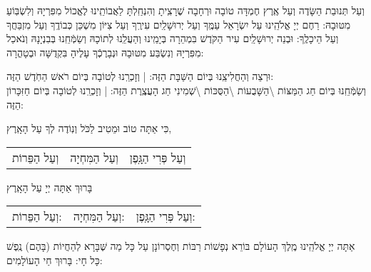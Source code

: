 \documentclass[a4paper, twoside, openany, parskip=half, 10pt]{article}
\begin{document}
וְעַל תְּנוּבַת הַשָּׂדֶה וְעַל אֶֽרֶץ חֶמְדָּה טוֹבָה וּרְחָבָה 
שֶׁרָצִֽיתָ וְהִנְחַֽלְתָּ לַאֲבוֹתֵֽינוּ לֶאֱכוֹל מִפִּרְיָהּ וְלִשְׂבּֽוֹעַ מִטּוּבָהּ: 
רַחֶם יְיָ אֱלֹהֵֽינוּ עַל יִשְׂרָאֵל עַמֶּֽךָ וְעַל יְרוּשָׁלַֽיִם עִירֶֽךָ וְעַל צִיּוֹן מִשְׁכַּן כְּבוֹדֶֽךָ וְעַל מִזְבַּחֲךָ וְעַל הֵיכָלֶֽךָ: וּבְנֵה יְרוּשָׁלַֽיִם עִיר הַקֹּדֶשׁ בִּמְהֵרָה בְּיָמֵֽינוּ וְהַעֲלֵֽנוּ לְתוֹכָהּ וְשַׂמְּֿחֵֽנוּ בְּבִנְיָנָהּ וְנֹאכַל מִפִּרְיָהּ וְנִשְׂבַּע מִטּוּבָהּ וּנְבָרֶכְֿךָ עָלֶיהָ בִּקְדֻשָּׁה וּבְטָהֳרָה:

\begin{small}

וּרְצֵה וְהַחֲלִיצֵֽנוּ בְּיוֹם הַשַּׁבָּת הַזֶּה: | 
וְזָכְרֵֽנוּ לְטוֹבָה בְּיוֹם רֹאשׁ הַחֹֽדֶשׁ הַזֶּה: \\
וְשַׂמְּֿחֵֽנוּ בְּיוֹם 
חַג הַמַּצּוֹת \textbackslash הַשָּׁבֻעוֹת \textbackslash הַסֻּכּוֹת \textbackslash  שְׁמִינִי חַג הָעֲצֶֽרֶת הַזֶּה: | 
וְזָכְרֵֽנוּ לְטוֹבָה בְּיוֹם חַזִּכָּרוֹן הַזֶּה:

\end{small}

כִּי אַתָּה טוֹב וּמֵטִיב לַכֹּל וְנֽוֹדֶה לְךָ עַל הָאָֽרֶץ, 

\begin{tabular}{c|c|c}
וְעַל הַפֵּרוֹת & וְעַל הַמִּחְיָה & וְעַל פְּרִי הַגָּֽפֶן
\end{tabular}

בָּרוּךְ אַתָּה יְיָ עַל הָאָֽרֶץ 

\begin{tabular}{c|c|c}
וְעַל הַפֵּרוֹת: & וְעַל הַמִּחְיָה: & וְעַל פְּרִי הַגָּֽפֶן:\\
\end{tabular}

\vspace{\baselineskip}

  אַתָּה יְיָ אֱלֹהֵֽינוּ מֶֽלֶךְ הָעוֹלָם בּוֹרֵא נְפָשׁוֹת רַבּוֹת וְחֶסְרוֹנָן 
עַל כָּל מַה שֶּׁבָּרָא לְהַחֲיוֹת (בָּהֶם) נֶֽפֶשׁ כָּל חָי: בָּרוּךְ חַי הָעוֹלָמִים:




 \nextpage
\end{document}
